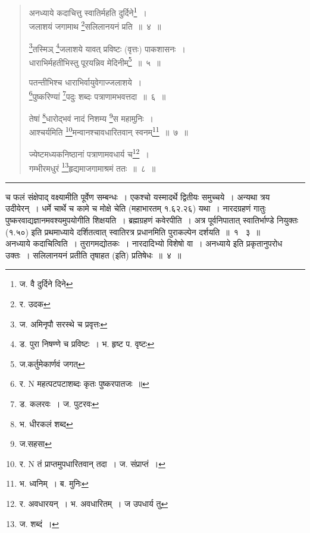 \documentclass[11pt, openany]{book}
\begin{document}
\newpage

\begin{quote}
{\na  अनध्याये कदाचित्तु स्वातिर्महति दुर्दिने\renewcommand{\thefootnote}{1}\footnote{ज. वै दुर्दिने दिने}~।\\
 जलाशयं जगामाथ \renewcommand{\thefootnote}{2}\footnote{र. उदक}सलिलानयनं प्रति~॥~४~॥

 \renewcommand{\thefootnote}{3}\footnote{ज. अमिनृपौ सरस्थे च प्रवृत्तः}तस्मिञ् \renewcommand{\thefootnote}{4}\footnote{ड. पुरा निषण्णे च प्रविष्टः~। भ. हृष्ट प. वृष्टः}जलाशये यावत् प्रविष्टः (वृत्तः) पाकशासनः~।\\
 धाराभिर्महतीभिस्तु पूरयन्निव मेदिनीम्\renewcommand{\thefootnote}{5}\footnote{ज.कर्तुमेकार्णवं जगत्}~॥~५~॥

 पतन्तीभिश्च धाराभिर्वायुवेगाज्जलाशये~।\\
 \renewcommand{\thefootnote}{6}\footnote{र. N महत्पटपटाशब्दः कृतः पुष्करपातजः~॥}पुष्करिण्यां \renewcommand{\thefootnote}{7}\footnote{ड. कलरवः~। ज. पुटरवः}पदुः शब्दः पत्राणामभवत्तदा~॥~६~॥

 तेषां \renewcommand{\thefootnote}{8}\footnote{भ. धीरकलं शब्द}धारोद्भवं नादं निशम्य \renewcommand{\thefootnote}{9}\footnote{ज.सहसा}स महामुनिः~।\\
 आश्चर्यमिति \renewcommand{\thefootnote}{10}\footnote{र. N तं प्राप्तमुपधारितवान् तदा~। ज. संप्राप्तं~।}मन्वानश्चावधारितवान् स्वनम्\renewcommand{\thefootnote}{11}\footnote{भ. ध्वनिम्~। ब. मुनिः}~॥~७~॥

 ज्येष्टमध्यकनिष्ठानां पत्राणामवधार्य च\renewcommand{\thefootnote}{12}\footnote{र. अवधारयन्~। भ. अवधारितम्~। ज उपधार्य तु}~।\\
 गम्भीरमधुरं \renewcommand{\thefootnote}{13}\footnote{ज. शब्दं~।}हृद्यमाजगामाश्रमं ततः~॥~८~॥}
\end{quote}

\hrule

\vspace{2mm}
\noindent
च फलं {\qtt संक्षेपाद् वक्ष्यामीति} पूर्वेण सम्बन्धः~। एकश्चो यस्मादर्थे द्वितीयः समुच्चये~। अन्यथा त्रय उदीयेरन्~। धर्मे चार्थे च कामे च मोक्षे चेति (महाभारतम् १.६२.२६) यथा~। {\qtt नारदग्रहणं} गातुः पुष्करवाद्यज्ञानमवश्यमुपयोगीति शिक्षयति~। ब्रह्मग्रहणं कवेरपीति~। अत्र पूर्वनिपातात् स्वातिर्भाण्डे नियुक्तः  (१.५०) इति प्रथमाध्याये दर्शितत्वात् स्वातिरत्र प्रधानमिति पुराकल्पेन दर्शयति~॥~१ \textendash\ ३~॥\\

{\qtt अनध्याये} कदाचित्विति~। {\qtt तुरागमद्योतकः}~। नारदादिभ्यो विशेषो वा~। अनध्याये इति प्रकृतानुपरोध उक्तः~। सलिलानयनं प्रतीति तृषाहत (इति) प्रतिषेधः~॥~४~॥\\
\end{document}
